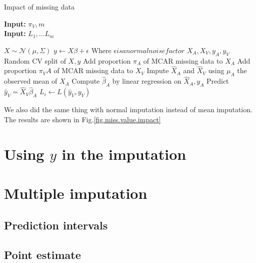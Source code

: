 		\begin{algorithm}[H]
	\caption{Impact of missing data}
	\hspace*{\algorithmicindent} \textbf{Input:} $\pi_V, m$  \\
	\hspace*{\algorithmicindent} \textbf{Input:} $L_1, \ldots L_m$  \\
	\begin{algorithmic}[1]
		\State $X \sim \mathcal{N}(\mu,\Sigma)$
		\State $y \leftarrow X \beta + \epsilon$ \Comment Where $\epsilon is a normal noise factor$
		\State $X_A, X_V, y_A, y_V$ \leftarrow Random CV split of $X,y$
		\For{$\pi_A \in [0, \frac{1}{m}, \ldots \frac{m-1}{m}$}
			\State Add proportion $\pi_A$ of MCAR missing data to $X_A$
			\State Add proportion $\pi_VA$ of MCAR missing data to $X_V$
			\State Impute $\hat{X}_A$ and $\hat{X}_V$ using $\mu_A$ the observed mean of $X_A$
			\State Compute $\hat{\beta}_A$ by linear regression on $\hat{X}_A, y_A$
			\State Predict $\hat{y}_V = \hat{X}_V \hat{\beta}_A$
			\Stat $L_i \leftarrow L(\hat{y}_V, y_V)$
		\EndFor
	\end{algorithmic}
\end{algorithm}

We also did the same thing with normal imputation instead of mean imputation. The results are shown in Fig.\ref{fig.miss.value.impact}



	\section{Using $y$ in the imputation}
	\section{Multiple imputation}
		\subsection{Prediction intervals}
		\subsection{Point estimate}